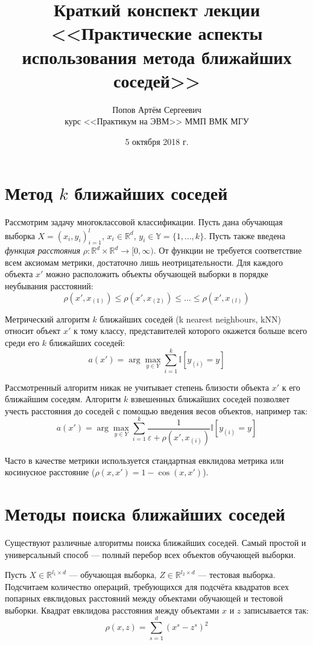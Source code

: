 \documentclass[12pt,fleqn]{article}
\title{Краткий конспект лекции \\ <<Практические аспекты использования метода ближайших соседей>>}
\author{Попов Артём Сергеевич \\ курс <<Практикум на ЭВМ>> ММП ВМК МГУ}
\date{5 октября 2018 г.}
\newcommand{\real}{\mathbb{R}}
\begin{document}
\maketitle

\section{Метод $k$ ближайших соседей}
Рассмотрим задачу многоклассовой классификации.
Пусть дана обучающая выборка $X = (x_i, y_i)^{l}_{i = 1}$, $x_i \in \mathbb{R}^{d}$, $y_i \in \mathbb{Y} = \{1, \ldots, k\}$. 
Пусть также введена \textit{функция расстояния} $\rho: \mathbb{R}^{d} \times \mathbb{R}^{d} \to [0, \infty)$. 
От функции не требуется соответствие всем аксиомам метрики, достаточно лишь неотрицательности. 
Для каждого объекта $x'$ можно расположить объекты обучающей выборки в порядке неубывания расстояний:
\[
\rho(x', x_{(1)}) \leqslant \rho(x', x_{(2)}) \leqslant \ldots \leqslant \rho(x', x_{(l)})
\]

Метрический алгоритм $k$ ближайших соседей (k nearest neighbours, kNN) относит объект $x'$ к тому классу, представителей которого окажется больше всего среди его $k$ ближайших соседей:
\[
a(x') = \arg \max_{y \in Y} \sum_{i = 1}^{k} \mathbb{I}[y_{(i)} = y]
\]

Рассмотренный алгоритм никак не учитывает степень близости объекта $x'$ к его ближайшим соседям. 
Алгоритм $k$ взвешенных ближайших соседей позволяет учесть расстояния до соседей с помощью введения весов объектов, например так:
\[
a(x') = \arg \max_{y \in Y} \sum_{i = 1}^{k} \frac{1}{\varepsilon + \rho(x', x_{(i)})}\mathbb{I}[y_{(i)} = y]
\]

Часто в качестве метрики используется стандартная евклидова метрика или косинусное расстояние ($\rho(x, x') = 1 - \cos(x, x')$).

\section{Методы поиска ближайших соседей}
Существуют различные алгоритмы поиска ближайших соседей.
Самый простой и универсальный способ --- полный перебор всех объектов обучающей выборки. 

Пусть $X \in \real^{l_1 \times d}$ --- обучающая выборка, $Z \in \real^{l_2 \times d}$ --- тестовая выборка. Подсчитаем количество операций, требующихся для подсчёта квадратов всех попарных евклидовых расстояний между объектами обучающей и тестовой выборки.
Квадрат евклидова расстояния между объектами $x$ и $z$ записывается так:
\[
\rho(x, z) = \sum_{s=1}^{d}(x^s - z^s)^2
\]
\end{document}
